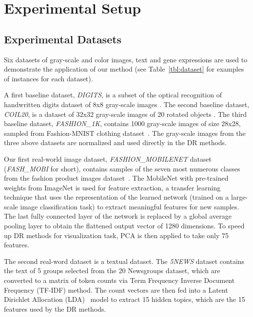 \section{Experimental Setup}\label{sec:xp:setup}


\subsection{Experimental Datasets}\label{sec:xp:data}

Six datasets of gray-scale and color images, text and gene expressions are used to demonstrate the application of our method (see Table~\ref{tbl:dataset} for examples of instances for each dataset).

A first baseline dataset, \emph{DIGITS}, is a subset of the optical recognition of handwritten digits dataset of 8x8 gray-scale images \cite{kaynak1995methods}.
The second baseline dataset, \emph{COIL20}, is a dataset of 32x32 gray-scale images of 20 rotated objects  \cite{nene1996}.
The third baseline dataset, \emph{FASHION\_1K}, contains 1000 gray-scale images of size 28x28, sampled from Fashion-MNIST clothing dataset~\cite{xiao2017/online}.
The gray-scale images from the three above datasets are normalized and used directly in the DR methods.

Our first real-world image dataset, \emph{FASHION\_MOBILENET} dataset (\emph{FASH\_MOBI} for short), contains samples of the seven most numerous classes from the fashion product images dataset~\cite{fashionproduct}.
The MobileNet\cite{howard2017mobilenets} with pre-trained weights from ImageNet is used for feature extraction, a transfer learning technique that uses the representation of the learned network (trained on a large-scale image classification task) to extract meaningful features for new samples.
The last fully connected layer of the network is replaced by a global average pooling layer \cite{lin2013network} to obtain the flattened output vector of 1280 dimensions.
To speed up DR methods for visualization task, PCA is then applied to take only 75 features.

The second real-word dataset is a textual dataset. The \emph{5NEWS} dataset contains the text of 5 groups selected from the 20 Newsgroups dataset, which are converted to a matrix of token counts via Term Frequency Inverse Document Frequency (TF-IDF) method.
The count vectors are then fed into a Latent Dirichlet Allocation (LDA)~\cite{blei2003latent} model to extract 15 hidden topics, which are the 15 features used by the DR methods.

